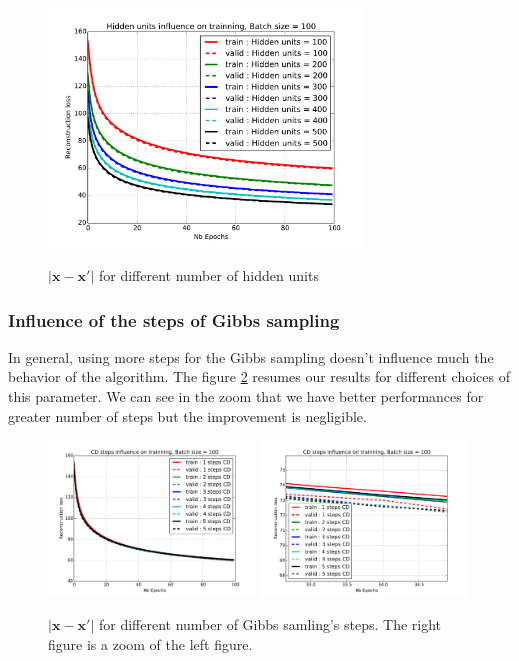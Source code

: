 \documentclass{article}
\begin{document}
\begin{figure}
\centering
\includegraphics[width=0.75\textwidth]{hidden_units}
\label{hidden}
\caption{$\lvert \mathbf{x} - \mathbf{x'} \rvert$ for different number of hidden units}
\end{figure}


\subsubsection{Influence of the steps of Gibbs sampling}

In general, using more steps for the Gibbs sampling doesn't influence much the behavior of the algorithm. The figure \ref{CD} resumes our results for different choices of this parameter. We can see in the zoom that we have better performances for greater number of steps but the improvement is negligible.

\begin{figure}
\centering
\includegraphics[width=0.49\textwidth]{CD}
\includegraphics[width=0.49\textwidth]{CD_zoom}
\label{CD}
\caption{$\lvert \mathbf{x} - \mathbf{x'} \rvert$ for different number of Gibbs samling's steps. The right figure is a zoom of the left figure.}
\end{figure}
\end{document}
